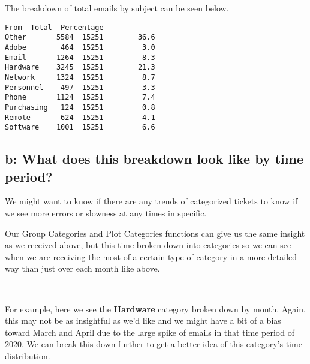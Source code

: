 \documentclass[11pt]{article}
\makeatletter
\newcommand{\boxspacing}{\kern\kvtcb@left@rule\kern\kvtcb@boxsep}
\newcommand{\prompt}[4]{
        \ttfamily\llap{{\color{#2}[#3]:\hspace{3pt}#4}}\vspace{-\baselineskip}
    }
\makeatother
\begin{document}
    The breakdown of total emails by subject can be seen below.

            \begin{tcolorbox}[breakable, size=fbox, boxrule=.5pt, pad at break*=1mm, opacityfill=0]
\prompt{Out}{outcolor}{36}{\boxspacing}
\begin{Verbatim}[commandchars=\\\{\}]
            From  Total  Percentage
Other       5584  15251        36.6
Adobe        464  15251         3.0
Email       1264  15251         8.3
Hardware    3245  15251        21.3
Network     1324  15251         8.7
Personnel    497  15251         3.3
Phone       1124  15251         7.4
Purchasing   124  15251         0.8
Remote       624  15251         4.1
Software    1001  15251         6.6
\end{Verbatim}
\end{tcolorbox}
        
    \hypertarget{b-what-does-this-breakdown-look-like-by-time-period}{%
\subsection{b: What does this breakdown look like by time
period?}\label{b-what-does-this-breakdown-look-like-by-time-period}}

We might want to know if there are any trends of categorized tickets to
know if we see more errors or slowness at any times in specific.

    Our Group Categories and Plot Categories functions can give us the same
insight as we received above, but this time broken down into categories
so we can see when we are receiving the most of a certain type of
category in a more detailed way than just over each month like above.


    \begin{center}
    \end{center}
    { \hspace*{\fill} \\}
    
    For example, here we see the \textbf{Hardware} category broken down by
month. Again, this may not be as insightful as we'd like and we might
have a bit of a bias toward March and April due to the large spike of
emails in that time period of 2020. We can break this down further to
get a better idea of this category's time distribution.

    \begin{center}
    \end{center}
    { \hspace*{\fill} \\}
    
\end{document}
